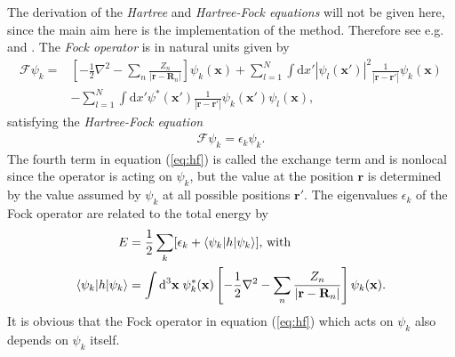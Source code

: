 \documentclass[twoside,        %
			   12pt,			%
               BCOR10mm,       %
               ngerman,english  %
               ]{scrartcl}
\begin{document}
The derivation of the \textit{Hartree} and \textit{Hartree-Fock equations} will not be given here, since the main aim here is the implementation of the method. Therefore see e.g. \cite[p. 56-60]{Thijssen2007} and \cite[chapter 3]{Jensen2013}. The \textit{Fock operator} is in natural units given by
 \begin{align} \label{eq:hf}
 \mathcal{F}\psi_k = &\left[-\frac{1}{2} \nabla^2 
 - \sum_n \frac{Z_n}{|\mathbf{r}- \mathbf{R}_n|}\right]\psi_k(\mathbf{x}) + \nonumber
 \sum_{l=1}^N \int \text{d}x' |\psi_l(\mathbf{x}')|^2 \frac{1}{|\mathbf{r}-\mathbf{r}'|} \psi_k(\mathbf{x}) \\
&- \sum_{l=1}^N \int \text{d}x' \psi^*(\mathbf{x}')\frac{1}{|\mathbf{r}-\mathbf{r}'|} \psi_k(\mathbf{x}')\psi_l(\mathbf{x})\text{,}
\end{align}
 satisfying the \textit{Hartree-Fock equation}
\begin{align*}
\mathcal{F} \psi_k = \epsilon_k \psi_k \text{.}
\end{align*} The fourth term in equation (\ref{eq:hf}) is called the exchange term \cite[p. 55]{Thijssen2007} and is nonlocal since the operator is acting on $\psi_k$, but the value at the position $\mathbf{r}$ is determined by the value assumed by $\psi_k$ at all possible positions $\mathbf{r}'$. The eigenvalues $\epsilon_k$ of the Fock operator are related to the total energy by
 \begin{align*}
 E &= \frac{1}{2} \sum_k [\epsilon_k + \braket{\psi_k|h|\psi_k}] \text{, with}\\
 \braket{\psi_k|h|\psi_k} &= \int \text{d}^3\mathbf{x}\; \psi_k^*(\mathbf{x}) \left[-\frac{1}{2} \nabla^2 
 - \sum_n \frac{Z_n}{|\mathbf{r}- \mathbf{R}_n|}\right] \psi_k(\mathbf{x}) \text{.}
 \end{align*} It is obvious that the Fock operator in equation (\ref{eq:hf}) which acts on $\psi_k$ also depends on $\psi_k$ itself.
    
    
    
    
\end{document}
